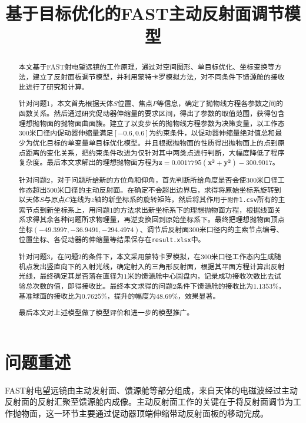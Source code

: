\documentclass{cumcmthesis}
\title{基于目标优化的FAST主动反射面调节模型}
\begin{document}
	\maketitle
	\begin{abstract}
		本文基于FAST射电望远镜的工作原理，通过对空间图形、单目标优化、坐标变换等方法，建立了反射面板调节模型，并利用蒙特卡罗模拟方法，对不同条件下馈源舱的接收比进行了研究和计算。\par 
		针对问题1，本文首先根据天体$S$位置、焦点$P$等信息，确定了抛物线方程各参数之间的函数关系。然后通过研究促动器伸缩量的要求区间，得出了参数的取值范围，获得包含理想抛物面的抛物面曲面簇。建立了以变步长的抛物线方程参数为决策变量，以工作态$300$米口径内促动器伸缩量满足$[-0.6,0.6]$为约束条件，以促动器伸缩量绝对值总和最少为优化目标的单变量单目标优化模型。并且根据抛物面的性质得出抛物面上的点到原点距离的变化关系，把约束条件改进为仅针对其中两类点进行判断，大幅度降低了程序复杂度。最后本文求解出的理想抛物面方程为$\bm{z = 0.0017795(x^2+y^2)-300.9017 }$。\par 
		针对问题2，对于问题所给新的方位角和仰角，首先判断所给角度是否会使$300$米口径工作态超出$500$米口径的主动反射面。在确定不会超出边界后，求得将原始坐标系旋转到以天体$S$与原点$C$连线为$z$轴的新坐标系的旋转矩阵，然后将其作用于\texttt{附件1.csv}所有的主索节点到新坐标系上，用问题1的方法求出新坐标系下的理想抛物面方程，根据线面关系求得其余各种问题所求物理量，再逆变换回到原始坐标系下。最终把理想抛物面顶点坐标$\bm{(-49.3997,-36.9491,-294.4974)}$、调节后反射面$300$米口径内的主索节点编号、位置坐标、各促动器的伸缩量等结果保存在\texttt{result.xlsx}中。\par 
		针对问题3，在问题2的条件下，本文采用蒙特卡罗模拟，在$300$米口径工作态内生成随机点发出竖直向下的入射光线，确定射入的三角形反射面，根据其平面方程计算出反射光线，最终确定其是否落在直径为$1$米的馈源舱中心圆盘内，记录成功接收次数比去试验总次数的值，即得接收比。最终本文求得的问题2条件下馈源舱的接收比为$\bm{1.1353\%}$，基准球面的接收比为$\bm{0.7625\%}$，提升的幅度为$\bm{48.69\%}$，效果显著。\par 
		最后本文对上述模型做了模型评价和进一步的模型推广。\par 
	\end{abstract}

	\section{问题重述}
		FAST射电望远镜由主动发射面、馈源舱等部分组成，来自天体的电磁波经过主动反射面的反射汇聚至馈源舱内成像。主动反射面工作的关键在于将反射面调节为工作抛物面，这一环节主要通过促动器顶端伸缩带动反射面板的移动完成。
\end{document}

